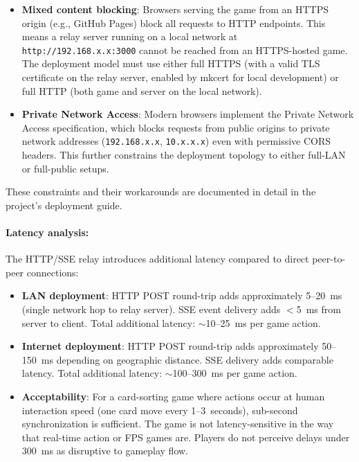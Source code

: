 \begin{itemize}
    \item \textbf{Mixed content blocking}: Browsers serving the game from an HTTPS origin (e.g., GitHub Pages) block all requests to HTTP endpoints. This means a relay server running on a local network at \texttt{http://192.168.x.x:3000} cannot be reached from an HTTPS-hosted game. The deployment model must use either full HTTPS (with a valid TLS certificate on the relay server, enabled by mkcert for local development) or full HTTP (both game and server on the local network).
    \item \textbf{Private Network Access}: Modern browsers implement the Private Network Access specification, which blocks requests from public origins to private network addresses (\texttt{192.168.x.x}, \texttt{10.x.x.x}) even with permissive CORS headers. This further constrains the deployment topology to either full-LAN or full-public setups.
\end{itemize}

These constraints and their workarounds are documented in detail in the project's deployment guide.

\paragraph*{Latency analysis:}

The HTTP/SSE relay introduces additional latency compared to direct peer-to-peer connections:

\begin{itemize}
    \item \textbf{LAN deployment}: HTTP POST round-trip adds approximately 5--20~ms (single network hop to relay server). SSE event delivery adds $<$5~ms from server to client. Total additional latency: $\sim$10--25~ms per game action.
    \item \textbf{Internet deployment}: HTTP POST round-trip adds approximately 50--150~ms depending on geographic distance. SSE delivery adds comparable latency. Total additional latency: $\sim$100--300~ms per game action.
    \item \textbf{Acceptability}: For a card-sorting game where actions occur at human interaction speed (one card move every 1--3~seconds), sub-second synchronization is sufficient. The game is not latency-sensitive in the way that real-time action or FPS games are. Players do not perceive delays under 300~ms as disruptive to gameplay flow.
\end{itemize}


